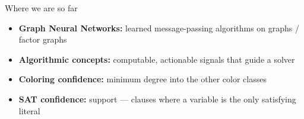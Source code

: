 \documentclass[aspectratio=169,10pt,dvipsnames]{beamer}
\begin{document}
\begin{frame}{Where we are so far}

\vspace{0.6em}

\begin{itemize}
    \item[\textcolor{green!55!black}{\Large\(\checkmark\)}]
    \normalsize \textbf{Graph Neural Networks:}
    learned message-passing algorithms on graphs / factor graphs

    \vspace{0.4em}

    \item[\textcolor{green!55!black}{\Large\(\checkmark\)}]
    \normalsize \textbf{Algorithmic concepts:}
    computable, actionable signals that guide a solver

    \vspace{0.4em}

    \item[\textcolor{green!55!black}{\Large\(\checkmark\)}]
    \normalsize \textbf{Coloring confidence:}
    minimum degree into the other color classes

    \vspace{0.4em}

    \item[\textcolor{green!55!black}{\Large\(\checkmark\)}]
    \normalsize \textbf{SAT confidence:}
    support — clauses where a variable is the only satisfying literal
\end{itemize}

\vspace{0.8em}


\end{frame}
\end{document}
